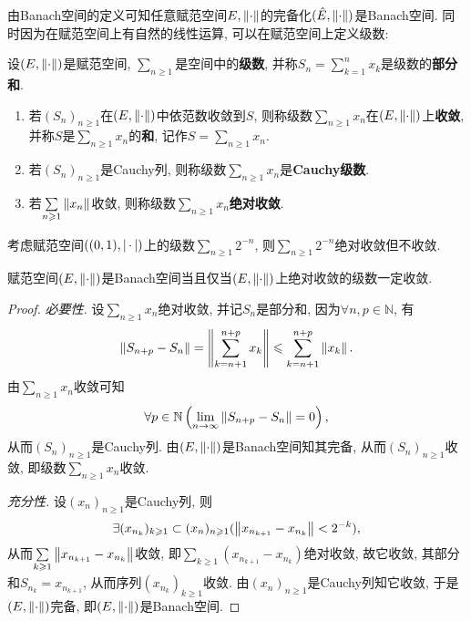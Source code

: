 	由Banach空间的定义可知任意赋范空间$ E,\left\| \cdot \right\| $的完备化$ (\hat{E},\left\| \cdot \right\|) $是Banach空间. 同时因为在赋范空间上有自然的线性运算, 可以在赋范空间上定义级数:
	
	\begin{Def}[级数]\label{def:级数}
	设$ (E,\left\| \cdot \right\|) $是赋范空间, $ \sum\limits_{n\geqslant 1} $是空间中的\textbf{级数}, 并称$ S_n=\sum\limits_{k=1}^nx_k $是级数的\textbf{部分和}.
	
	\begin{enumerate}[(1)]
	\item 若$ (S_n)_{n\geqslant 1} $在$ (E,\left\| \cdot \right\|) $中依范数收敛到$ S $, 则称级数$ \sum\limits_{n\geqslant 1}x_n $在$ (E,\left\| \cdot \right\|) $上\textbf{收敛}, 并称$ S $是$ \sum\limits_{n\geqslant 1}x_n $的\textbf{和}, 记作$ S=\sum\limits_{n\geqslant 1}x_n $.
	
	\item 若$ (S_n)_{n\geqslant 1} $是Cauchy列, 则称级数$ \sum\limits_{n\geqslant 1}x_n $是\textbf{Cauchy级数}.
	
	\item 若$ \sum\limits_{n\geqslant 1}\left\| x_n \right\| $收敛, 则称级数$ \sum\limits_{n\geqslant 1}x_n $\textbf{绝对收敛}.
	\end{enumerate}
	\end{Def}
	
	\begin{Rmk}
	考虑赋范空间$ ((0,1),\left| \,\cdot\, \right| ) $上的级数$ \sum\limits_{n\geqslant 1}2^{-n} $, 则$ \sum\limits_{n\geqslant 1}2^{-n} $绝对收敛但不收敛.
	\end{Rmk}
	
	\begin{Thm}
	赋范空间$ (E,\left\| \cdot \right\|) $是Banach空间当且仅当$ (E,\left\| \cdot \right\|) $上绝对收敛的级数一定收敛.
	\end{Thm}
	\begin{proof}
	\textsl{必要性.} 设$ \sum\limits_{n\geqslant 1}x_n $绝对收敛, 并记$ S_n $是部分和, 因为$ \forall n,p\in\mathbb{N} $, 有
	\[
	\left\| S_{n+p}-S_n \right\|=\left\| \sum_{k=n+1}^{n+p}x_k \right\|\leqslant\sum_{k=n+1}^{n+p}\left\| x_k \right\|.
	\]
	由$ \sum\limits_{n\geqslant 1}x_n $收敛可知
	\[
	\forall p\in\mathbb{N}\left(\lim_{n\to\infty}\left\| S_{n+p}-S_n \right\|=0\right),
	\]
	从而$ (S_n)_{n\geqslant 1} $是Cauchy列. 由$ (E,\left\| \cdot \right\|) $是Banach空间知其完备, 从而$ (S_n)_{n\geqslant 1} $收敛, 即级数$ \sum\limits_{n\geqslant 1}x_n $收敛.
	
	\textsl{充分性.} 设$ (x_n)_{n\geqslant 1} $是Cauchy列, 则
	\[
	\exists(x_{n_k})_{k\geqslant 1}\subset(x_n)_{n\geqslant 1}(\left\| x_{n_{k+1}}-x_{n_k} \right\|<2^{-k}),
	\]
	从而$ \sum\limits_{k\geqslant 1}\left\| x_{n_{k+1}}-x_{n_k} \right\| $收敛, 即$ \sum\limits_{k\geqslant 1}(x_{n_{k+1}}-x_{n_k}) $绝对收敛, 故它收敛, 其部分和$ S_{n_k}=x_{n_{k+1}} $, 从而序列$ (x_{n_k})_{k\geqslant 1} $收敛. 由$ (x_n)_{n\geqslant 1} $是Cauchy列知它收敛, 于是$ (E,\left\| \cdot \right\|) $完备, 即$ (E,\left\| \cdot \right\|) $是Banach空间.
	\end{proof}
	
